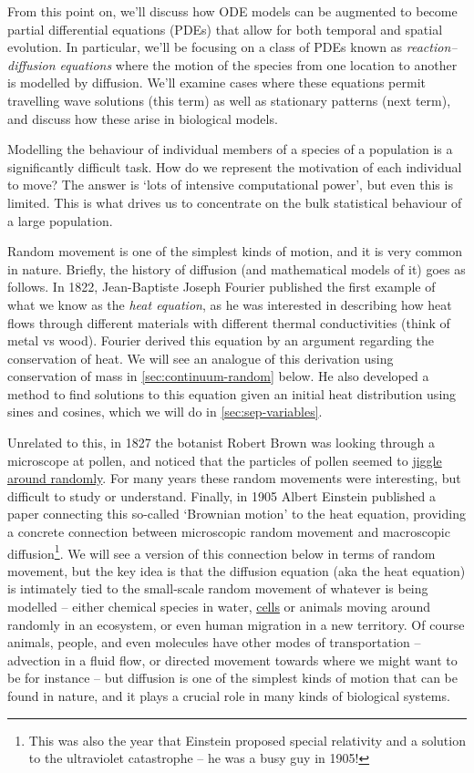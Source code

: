 \documentclass[main.tex]{subfiles}
\begin{document}
From this point on, we’ll discuss how ODE models can be augmented to become partial differential equations (PDEs) that allow for both temporal and spatial evolution. In particular, we’ll be focusing on a class of PDEs known as \emph{reaction--diffusion equations} where the motion of the species from one location to another is modelled by diffusion. We’ll examine cases where these equations permit travelling wave solutions (this term) as well as stationary patterns (next term), and discuss how these arise in biological models.

Modelling the behaviour of individual members of a species of a population is a significantly difficult task. How do we represent the motivation of each individual to move? The answer is `lots of intensive computational power', but even this is limited. This is what drives us to concentrate on the bulk statistical behaviour of a large population. 

Random movement is one of the simplest kinds of motion, and it is very common in nature. Briefly, the history of diffusion (and mathematical models of it) goes as follows. In 1822, Jean-Baptiste Joseph Fourier published the first example of what we know as the \emph{heat equation}, as he was interested in describing how heat flows through different materials with different thermal conductivities (think of metal vs wood). Fourier derived this equation by an argument regarding the conservation of heat. We will see an analogue of this derivation using conservation of mass in \cref{sec:continuum-random} below. He also developed a method to find solutions to this equation given an initial heat distribution using sines and cosines, which we will do in \cref{sec:sep-variables}.

Unrelated to this, in 1827 the botanist Robert Brown was looking through a microscope at pollen, and noticed that the particles of pollen seemed to \href{https://www.youtube.com/watch?v=R5t-oA796to}{jiggle around randomly}. For many years these random movements were interesting, but difficult to study or understand. Finally, in 1905 Albert Einstein published a paper connecting this so-called `Brownian motion' to the heat equation, providing a concrete connection between microscopic random movement and macroscopic diffusion\footnote{This was also the year that Einstein proposed special relativity and a solution to the ultraviolet catastrophe -- he was a busy guy in 1905!}. We will see a version of this connection below in terms of random movement, but the key idea is that the diffusion equation (aka the heat equation) is intimately tied to the small-scale random movement of whatever is being modelled -- either chemical species in water, \href{https://www.youtube.com/watch?v=oYsEid5YES4}{cells} or animals moving around randomly in an ecosystem, or even human migration in a new territory. Of course animals, people, and even molecules have other modes of transportation -- advection in a fluid flow, or directed movement towards where we might want to be for instance -- but diffusion is one of the simplest kinds of motion that can be found in nature, and it plays a crucial role in many kinds of biological systems.
\end{document}
